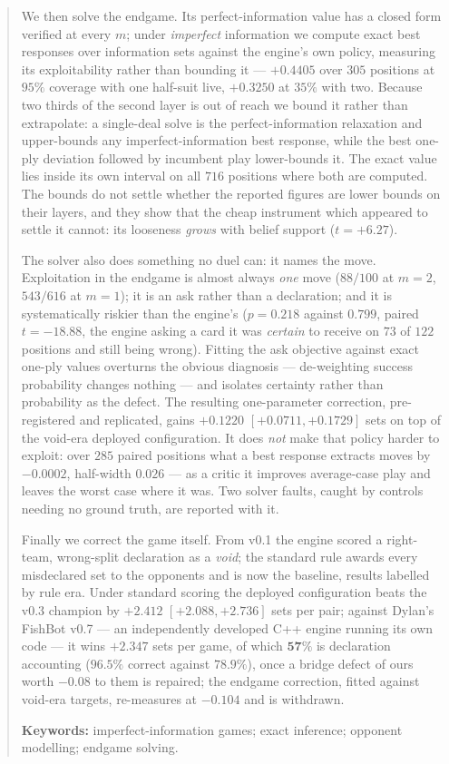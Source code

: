 \documentclass[11pt,a4paper]{article}
\begin{document}
\begin{abstract}
We then solve the endgame. Its perfect-information value has a closed form
verified at every $m$; under
\emph{imperfect} information we compute exact best responses over information
sets against the engine's own policy, measuring its exploitability rather than
bounding it --- $+0.4405$ over $305$ positions at $95\%$ coverage with one
half-suit live, $+0.3250$ at $35\%$ with two. Because two thirds of the second layer is out of
reach we bound it rather than extrapolate: a single-deal solve is the perfect-information relaxation and
upper-bounds any imperfect-information best response, while the best one-ply
deviation followed by incumbent play lower-bounds it. The exact value lies
inside its own interval on all $716$ positions where both are computed. The
bounds do not settle whether the reported figures are lower bounds on their
layers, and they show that the cheap instrument which appeared to settle it
cannot: its looseness \emph{grows} with belief support ($t = +6.27$).

The solver also does something no duel can: it names the move. Exploitation in
the endgame is almost always \emph{one} move ($88/100$ at $m = 2$, $543/616$ at
$m = 1$); it is an ask rather than a declaration; and it is systematically
riskier than the engine's ($p = 0.218$ against $0.799$, paired $t = -18.88$,
the engine asking a card it was \emph{certain} to receive on $73$ of $122$
positions and still being wrong). Fitting the ask objective
against exact one-ply values overturns the obvious diagnosis --- de-weighting
success probability changes nothing --- and isolates certainty rather than
probability as the defect. The resulting one-parameter correction, pre-registered and replicated, gains
$\mathbf{+0.1220}$ $[+0.0711, +0.1729]$ sets on top of the void-era deployed
configuration. It does \emph{not} make that policy harder to
exploit: over $285$ paired positions what a best response extracts moves by
$-0.0002$, half-width $0.026$ --- as a critic it improves average-case play
and leaves the worst case where it was. Two solver faults, caught by controls
needing no ground truth, are reported with it.

Finally we correct the game itself. From v0.1 the engine scored a
right-team, wrong-split declaration as a \emph{void}; the standard rule
awards every misdeclared set to the opponents and is now the baseline,
results labelled by rule era. Under standard scoring the deployed
configuration beats the v0.3 champion by $\mathbf{+2.412}$
$[+2.088, +2.736]$ sets per pair; against Dylan's FishBot v0.7 --- an
independently developed C++ engine running its own code --- it wins
$\mathbf{+2.347}$ sets per game, of which $\mathbf{57\%}$ is declaration
accounting ($96.5\%$ correct against $78.9\%$), once a bridge defect of ours
worth $-0.08$ to them is repaired;
the endgame correction, fitted against void-era targets, re-measures at
$-0.104$ and is withdrawn.

\vspace{1pt}
\noindent\textbf{Keywords:} imperfect-information games; exact inference; opponent modelling; endgame solving.
\end{abstract}
\end{document}
